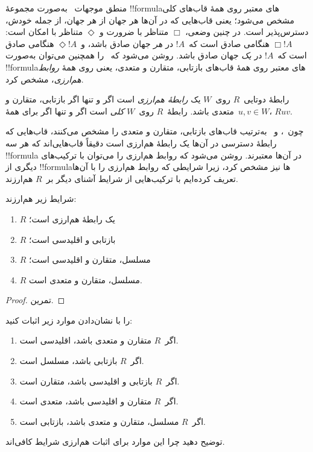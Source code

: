 \documentclass[../../../include/open-logic-section]{subfiles}
\begin{document}


منطق موجهات~ به‌صورت مجموعهٔ !!{formula}های معتبر روی همهٔ
قاب‌های کلی مشخص می‌شود؛ یعنی قاب‌هایی که در آن‌ها هر جهان از هر جهان،
از جمله خودش، دسترس‌پذیر است. در چنین وضعی، $\Box$ متناظر با ضرورت و
$\Diamond$ متناظر با امکان است: $\Box !A$ هنگامی صادق است که~$!A$ در
\emph{هر} جهان صادق باشد، و~$\Diamond !A$ هنگامی صادق است که~$!A$ در
\emph{یک} جهان صادق باشد. روشن می‌شود که~ را همچنین می‌توان
به‌صورت !!{formula}های معتبر روی همهٔ قاب‌های بازتابی، متقارن و متعدی،
یعنی روی همهٔ \emph{روابط هم‌ارزی}، مشخص کرد.

\begin{defn}
  رابطهٔ دوتایی~$R$ روی~$W$ یک \emph{رابطهٔ هم‌ارزی} است اگر و تنها
  اگر بازتابی، متقارن و متعدی باشد. رابطهٔ~$R$ روی~$W$ \emph{کلی} است
  اگر و تنها اگر برای همهٔ~$u,v \in W$، $Ruv$.
\end{defn}

چون~،  و~ به‌ترتیب قاب‌های بازتابی، متقارن و متعدی
را مشخص می‌کنند، قاب‌هایی که رابطهٔ دسترسی در آن‌ها یک رابطهٔ هم‌ارزی
است دقیقاً قاب‌هایی‌اند که هر سه !!{formula} در آن‌ها معتبرند. روشن
می‌شود که روابط هم‌ارزی را می‌توان با ترکیب‌های دیگری از !!{formula}ها
نیز مشخص کرد، زیرا شرایطی که روابط هم‌ارزی را با آن‌ها تعریف کرده‌ایم
با ترکیب‌هایی از شرایط آشنای دیگر بر~$R$ هم‌ارزند.

\begin{prop}
  شرایط زیر هم‌ارزند:
  \begin{enumerate}
  \item $R$ یک رابطهٔ هم‌ارزی است؛
  \item $R$ بازتابی و اقلیدسی است؛
  \item $R$ مسلسل، متقارن و اقلیدسی است؛
  \item $R$ مسلسل، متقارن و متعدی است.
  \end{enumerate}
\end{prop}

\begin{proof}
  تمرین.
\end{proof}

\begin{prob}
   را با نشان‌دادن موارد زیر
  اثبات کنید:
  \begin{enumerate}
  \item اگر~$R$ متقارن و متعدی باشد، اقلیدسی است.
  \item اگر~$R$ بازتابی باشد، مسلسل است.
  \item اگر~$R$ بازتابی و اقلیدسی باشد، متقارن است.
  \item اگر~$R$ متقارن و اقلیدسی باشد، متعدی است.
  \item اگر~$R$ مسلسل، متقارن و متعدی باشد، بازتابی است.
  \end{enumerate}
  توضیح دهید چرا این موارد برای اثبات هم‌ارزی شرایط کافی‌اند.
\end{prob}
\end{document}
